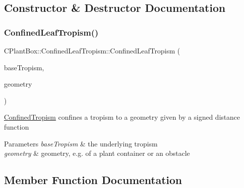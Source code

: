 \subsection{Constructor \& Destructor Documentation}
\mbox{\label{classCPlantBox_1_1ConfinedLeafTropism_a4edff5fe35c9f489f4e86ac972c362d2}} 
\subsubsection{\texorpdfstring{Confined\+Leaf\+Tropism()}{ConfinedLeafTropism()}}
{\footnotesize\ttfamily C\+Plant\+Box\+::\+Confined\+Leaf\+Tropism\+::\+Confined\+Leaf\+Tropism (\begin{DoxyParamCaption}\item[{\hyperlink{classCPlantBox_1_1LeafTropismFunction}{Leaf\+Tropism\+Function} $\ast$}]{base\+Tropism,  }\item[{\hyperlink{classCPlantBox_1_1SignedDistanceFunction}{Signed\+Distance\+Function} $\ast$}]{geometry }\end{DoxyParamCaption})\hspace{0.3cm}{\ttfamily [inline]}}

\hyperlink{classCPlantBox_1_1ConfinedTropism}{Confined\+Tropism} confines a tropism to a geometry given by a signed distance function


\begin{DoxyParams}{Parameters}
{\em base\+Tropism} & the underlying tropism \\
\hline
{\em geometry} & geometry, e.\+g. of a plant container or an obstacle \\
\hline
\end{DoxyParams}


\subsection{Member Function Documentation}
\mbox{\label{classCPlantBox_1_1ConfinedLeafTropism_a0574aa544341937fc9df37a972cd0833}} 
